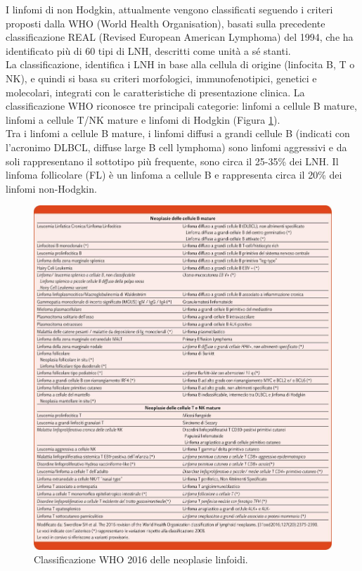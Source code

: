 I linfomi di non Hodgkin, attualmente vengono classificati seguendo i criteri proposti dalla WHO 
(World Health Organisation), basati sulla precedente classificazione REAL (Revised European American Lymphoma) 
del 1994, che ha identificato più di 60 tipi di LNH, descritti come unità a sé stanti\cite{AIOM}.\\
La classificazione, identifica i LNH in base alla cellula di origine 
(linfocita B, T o NK), e quindi si basa su criteri morfologici, immunofenotipici, genetici e molecolari, 
integrati con le caratteristiche di presentazione clinica\cite{AIOM}. 
La classificazione WHO riconosce tre principali categorie: linfomi a cellule B mature, linfomi a cellule T/NK
mature e linfomi di Hodgkin (Figura \ref{fig:FIGURE_2.13}).\\
Tra i linfomi a cellule B mature, i linfomi diffusi a grandi cellule B (indicati con l’acronimo DLBCL, 
diffuse large B cell lymphoma) sono linfomi aggressivi e da soli rappresentano il sottotipo più frequente, 
sono circa il 25-35\% dei LNH\cite{AIOM}.
Il linfoma follicolare (FL) è un linfoma a cellule B e rappresenta circa il 20\% dei linfomi non-Hodgkin.\\

\begin{figure}[H]
    \begin{center}
    \includegraphics[width=1.0\columnwidth]{img/CLASS.WHO.jpeg}
    \vspace{-3mm}
    \end{center}
    \caption{Classificazione WHO 2016 delle neoplasie linfoidi.
    \cite{img15-18}}
    \label{fig:FIGURE_2.13}
\end{figure}


